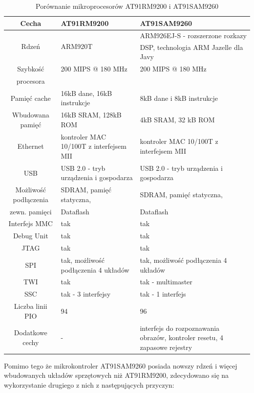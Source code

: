 \documentclass[a4paper,12pt]{book}
\begin{document}
				\begin{table}[]
					\extrarowheight=3pt
					\begin{tabularx}{\textwidth }{|c|X|X|}
						\hline \textbf{Cecha} &\textbf{AT91RM9200} & \textbf{AT91SAM9260} \\ 
						\hline Rdzeń & ARM920T & ARM926EJ-S - rozszerzone rozkazy DSP, technologia ARM Jazelle\textsuperscript{\textregistered} dla Javy \\
						\hline Szybkość & 200 MIPS @ 180 MHz & 200 MIPS @ 180 MHz \\
							procesora & & \\
						\hline Pamięć cache & 16kB dane, 16kB instrukcje & 8kB dane i 8kB instrukcje \\
						\hline Wbudowana pamięć & 16kB SRAM, 128kB ROM & 4kB SRAM, 32 kB ROM \\
						\hline Ethernet & kontroler MAC 10/100T z interfejsem MII & kontroler MAC 10/100T z interfejsem MII \\
						\hline USB & USB 2.0 - tryb urządzenia i gospodarza & USB 2.0 - tryb urządzenia i gospodarza \\
						\hline Możliwość podłączenia & SDRAM, pamięć statyczna, & SDRAM, pamięć statyczna, \\
							zewn. pamięci & Dataflash & Dataflash \\
						\hline Interfejs MMC & tak & tak \\
						\hline Debug Unit & tak & tak \\
						\hline JTAG & tak & tak \\
						\hline SPI & tak, możliwość podłączenia 4 układów & tak, możliwość podłączenia 4 układów \\
						\hline TWI & tak & tak - multimaster \\
						\hline SSC & tak - 3 interfejsy & tak - 1 interfejs \\
						\hline Liczba linii PIO & 94 & 96 \\
						\hline Dodatkowe cechy & - & interfejs do rozpoznawania obrazów, kontroler resetu, 4 zapasowe rejestry\\
						\hline 
					\end{tabularx}
					\caption{Porównanie mikroprocesorów AT91RM9200 i AT91SAM9260}
					\label{tab:arm_comparison}
				\end{table}
			Pomimo tego że mikrokontroler AT91SAM9260 posiada nowszy rdzeń i więcej wbudowanych układów sprzętowych niż AT91RM9200, zdecydowano się na wykorzystanie drugiego z nich z następujących przyczyn:
\end{document}
